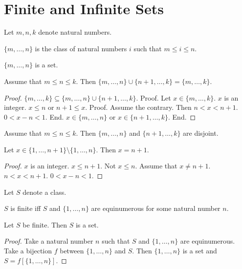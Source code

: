 \documentclass{article}
\newcommand{\Seq}[2]{\{#1,\dots,#2\}}
\begin{document}
  \section{Finite and Infinite Sets}

  \begin{forthel}
  Let $m,n,k$ denote natural numbers.

  \begin{definition}
  $\Seq{m}{n}$ is the class of
  natural numbers $i$ such that $m \leq i \leq n$.
  \end{definition}

  \begin{lemma}
  $\Seq{m}{n}$ is a set.
  \end{lemma}

  \begin{lemma}
  Assume that $m \leq n \leq k$.
  Then $\Seq{m}{n} \cup \Seq{n+1}{k} = \Seq{m}{k}$.
  \end{lemma}
  \begin{proof}
  $\Seq{m}{k} \subseteq \Seq{m}{n} \cup \Seq{n+1}{k}$.
  Proof.
  Let $x \in \Seq{m}{k}$. $x$ is an integer.
  $x \leq n$ or $n+1 \leq x$. Proof. Assume the contrary. Then $n < x < n+1$. $0 < x - n < 1$. End.
  $x \in \Seq{m}{n}$ or $x \in \Seq{n+1}{k}$. End.
  \end{proof}


  \begin{lemma} Assume that $m \leq n \leq k$.
  Then $\Seq{m}{n}$ and $\Seq{n+1}{k}$ are disjoint.
  \end{lemma}

  \begin{lemma} Let $x \in \Seq{1}{n+1} \setminus \Seq{1}{n}$.
  Then $x = n+1$.
  \end{lemma}
  \begin{proof}
  $x$ is an integer.
  $x \leq n+1$. Not $x \leq n$.
  Assume that $x \neq n+1$.
  $n < x < n+1$.
  $0 < x - n < 1$.
  \end{proof}

  Let $S$ denote a class.

  \begin{definition}
  $S$ is finite iff $S$ and $\Seq{1}{n}$ are equinumerous for some
  natural number $n$.
  \end{definition}

  \begin{lemma}
  Let $S$ be finite. Then $S$ is a set.
  \end{lemma}
  \begin{proof}
  Take a natural number $n$ such that $S$ and $\Seq{1}{n}$ are equinumerous.
  Take a bijection $f$ between $\Seq{1}{n}$ and $S$.
  Then $\Seq{1}{n}$ is a set and $S = f[\Seq{1}{n}]$.
  \end{proof}
  \end{forthel}
\end{document}
